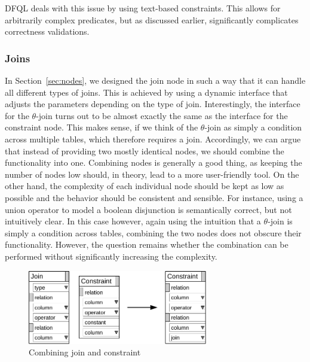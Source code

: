 \documentclass[11pt,a4paper]{globis-book}
\begin{document}
DFQL deals with this issue by using text-based constraints. This allows for arbitrarily complex predicates, but as discussed earlier, significantly complicates correctness validations.

\subsubsection*{Joins}
In Section~\ref{sec:nodes}, we designed the join node in such a way that it can handle all different types of joins. This is achieved by using a dynamic interface that adjusts the parameters depending on the type of join. Interestingly, the interface for the $\theta$-join turns out to be almost exactly the same as the interface for the constraint node. This makes sense, if we think of the $\theta$-join as simply a condition across multiple tables, which therefore requires a join. Accordingly, we can argue that instead of providing two mostly identical nodes, we should combine the functionality into one. Combining nodes is generally a good thing, as keeping the number of nodes low should, in theory, lead to a more user-friendly tool. On the other hand, the complexity of each individual node should be kept as low as possible and the behavior should be consistent and sensible. For instance, using a union operator to model a boolean disjunction is semantically correct, but not intuitively clear. In this case however, again using the intuition that a $\theta$-join is simply a condition across tables, combining the two nodes does not obscure their functionality. However, the question remains whether the combination can be performed without significantly increasing the complexity.

\begin{figure}[h]
  \centering
  \includegraphics[width=0.7\textwidth]{resources/ConstraintNew.pdf}
  \caption{Combining join and constraint}
  \label{fig:constraint_new}
\end{figure}
\end{document}
